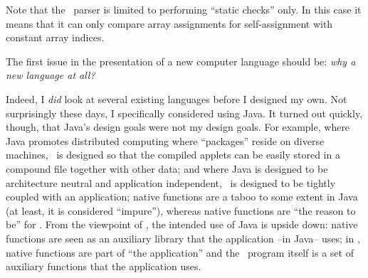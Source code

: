 {{        Note that the \Small\ parser is limited to performing ``static checks''
        only. In this case it means that it can only compare array assignments
        for self-assignment with constant array indices.
\endlist
{}


The first issue in the presentation of a new computer language should be:
{\it why a new language at all?}



Indeed, I {\it did\/} look at several existing languages before I designed my
own. Not surprisingly these days, I specifically considered using Java. It
turned out quickly, though, that Java's design goals were not my design goals.
For example, where Java promotes distributed computing where ``packages''
reside on diverse machines, \Small\ is designed so that the compiled applets can
be easily stored in a compound file together with other data; and where Java
is designed to be architecture neutral and application independent, \Small\ is
designed to be tightly coupled with an application; native functions are a
taboo to some extent in Java (at least, it is considered ``impure''), whereas
native functions are ``the reason to be'' for \Small. From the viewpoint of
\Small, the intended use of Java is upside down: native functions are seen
as an auxiliary library that the application --in Java-- uses; in \Small, native
functions are part of ``the application'' and the \Small\ program itself is a set
of auxiliary functions that the application uses.

}}
